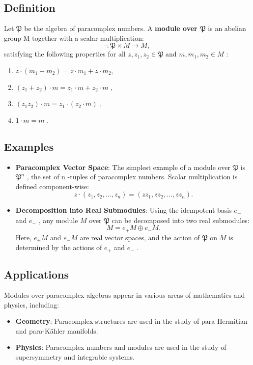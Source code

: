 \subsection{Definition}
Let  $ \mathfrak{P}$ be the algebra of paracomplex numbers. A \textbf{module over  $ \mathfrak{P}$} is an abelian group   M    together with a scalar multiplication:
\[
\cdot :  \mathfrak{P} \times M \to M,
\]
satisfying the following properties for all   $z, z_1, z_2 \in  \mathfrak{P}$     and   $m, m_1, m_2 \in M $  :
\begin{enumerate}
    \item   $z \cdot (m_1 + m_2) = z \cdot m_1 + z \cdot m_2   $,
    \item  $ (z_1 + z_2) \cdot m = z_1 \cdot m + z_2 \cdot m $  ,
    \item   $(z_1 z_2) \cdot m = z_1 \cdot (z_2 \cdot m) $  ,
    \item  $ 1 \cdot m = m $  .
\end{enumerate}

\subsection{Examples}
\begin{itemize}
    \item \textbf{Paracomplex Vector Space}: The simplest example of a module over   $ \mathfrak{P}$     is  $ \mathfrak{P}^n$   , the set of   n   -tuples of paracomplex numbers. Scalar multiplication is defined component-wise:
    \[
    z \cdot (z_1, z_2, \dots, z_n) = (z z_1, z z_2, \dots, z z_n).
    \]

    \item \textbf{Decomposition into Real Submodules}: Using the idempotent basis   $e_+ $   and  $ e_- $  , any module  $ M$    over   $\mathfrak{P} $   can be decomposed into two real submodules:
    \[
    M = e_+ M \oplus e_- M.
    \]
    Here,  $ e_+ M $   and  $ e_- M  $  are real vector spaces, and the action of  $\mathfrak{P}$  on  $ M $   is determined by the actions of  $ e_+  $  and $  e_- $  .
\end{itemize}

\subsection{Applications}
Modules over paracomplex algebras appear in various areas of mathematics and physics, including:
\begin{itemize}
    \item \textbf{Geometry}: Paracomplex structures are used in the study of para-Hermitian and para-Kähler manifolds.
    \item \textbf{Physics}: Paracomplex numbers and modules are used in the study of supersymmetry and integrable systems.
\end{itemize}


